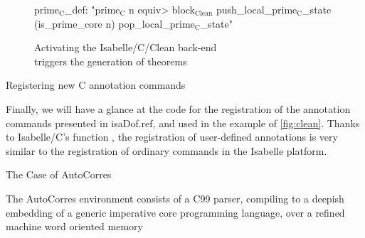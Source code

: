 \begin{isabellebody}
\begin{isamarkuptext}
\begin{figure}
\begin{minipage}{0.45\linewidth}
\begin{isar}
prime$_{\text{C}}$_def: "prime$_{\text{C}}$ n \<equiv>
  block$_{\text{Clean}}$ push_local_prime$_{\text{C}}$_state
             (is_prime_core n)
             pop_local_prime$_{\text{C}}$_state"
\end{isar}
  \end{minipage}
  \caption{Activating the Isabelle/C/Clean back-end \\ 
           triggers the generation of theorems}
  \label{fig:clean}
\end{figure}%
\end{isamarkuptext}\isamarkuptrue%
%
\begin{isamarkupfigure*}%
[label = {C-sample10},type = {Isa_COL.figure}, args={label = {C-sample10},type = {Isa_COL.figure}, Isa_COL.figure.relative_width = {40}, Isa_COL.figure.src = {figures/A-C-Source10}, Isa_COL.figure.spawn_columns = {True}}]Registering new C annotation commands%
\end{isamarkupfigure*}\isamarkuptrue%
%
\begin{isamarkuptext}%
Finally, we will have a glance at the code for the registration of the annotation commands presented
in \csname isaDof.ref, and used in the example of \autoref{fig:clean}. Thanks to
Isabelle/C's function , the registration of
user-defined annotations is very similar to the registration of ordinary commands in the Isabelle
platform.%
\end{isamarkuptext}\isamarkuptrue%
%
\begin{isamarkupsubsection*}%
[label = {autocorres},type = {scholarly_paper.technical}, args={label = {autocorres},type = {scholarly_paper.technical}, Isa_COL.text_element.level = {}, Isa_COL.text_element.referentiable = {False}, Isa_COL.text_element.variants = {{STR ''outline'', STR ''document''}}, scholarly_paper.text_section.main_author = {}, scholarly_paper.text_section.fixme_list = {}, Isa_COL.text_element.level = {}, scholarly_paper.technical.definition_list = {}}]The Case of AutoCorres%
\end{isamarkupsubsection*}\isamarkuptrue%
%
\begin{isamarkuptext}%
The AutoCorres environment consists of a C99 parser, compiling to a deepish embedding
of a generic imperative core programming language, over a refined machine word oriented memory

\end{isamarkuptext}
\end{isabellebody}

